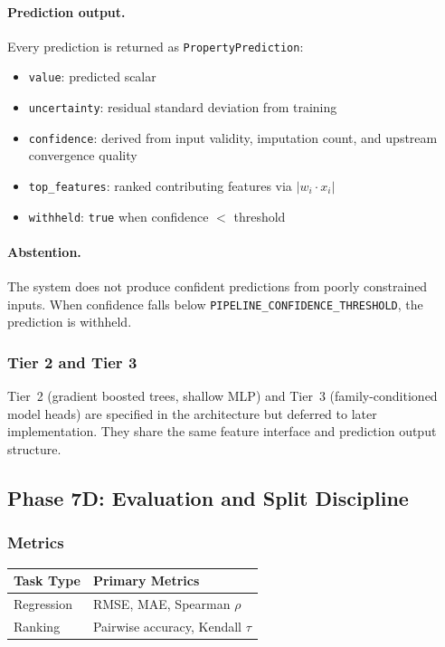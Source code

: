 \documentclass[11pt]{article}
\newcommand{\type}[1]{\texttt{#1}}
\begin{document}
\paragraph{Prediction output.}
Every prediction is returned as \type{PropertyPrediction}:
\begin{itemize}
  \item \texttt{value}: predicted scalar
  \item \texttt{uncertainty}: residual standard deviation from training
  \item \texttt{confidence}: derived from input validity, imputation count,
        and upstream convergence quality
  \item \texttt{top\_features}: ranked contributing features via
        $|w_i \cdot x_i|$
  \item \texttt{withheld}: \texttt{true} when confidence $<$ threshold
\end{itemize}

\paragraph{Abstention.}
The system does not produce confident predictions from poorly constrained
inputs.  When confidence falls below
\texttt{PIPELINE\_CONFIDENCE\_THRESHOLD}, the prediction is withheld.

\subsubsection{Tier 2 and Tier 3}

Tier~2 (gradient boosted trees, shallow MLP) and Tier~3
(family-conditioned model heads) are specified in the architecture but
deferred to later implementation.  They share the same feature interface
and prediction output structure.

\subsection{Phase 7D: Evaluation and Split Discipline}

\subsubsection{Metrics}

\begin{center}
\begin{tabular}{ll}
\toprule
\textbf{Task Type} & \textbf{Primary Metrics} \\
\midrule
Regression & RMSE, MAE, Spearman $\rho$ \\
Ranking & Pairwise accuracy, Kendall $\tau$ \\
\bottomrule
\end{tabular}
\end{center}
\end{document}
